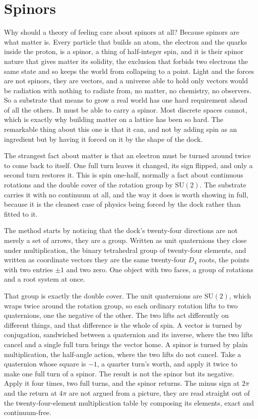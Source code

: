 \section{Spinors}

Why should a theory of feeling care about spinors at all? Because spinors are what matter is. Every particle that builds an atom, the electron and the quarks inside the proton, is a spinor, a thing of half-integer spin, and it is their spinor nature that gives matter its solidity, the exclusion that forbids two electrons the same state and so keeps the world from collapsing to a point. Light and the forces are not spinors, they are vectors, and a universe able to hold only vectors would be radiation with nothing to radiate from, no matter, no chemistry, no observers. So a substrate that means to grow a real world has one hard requirement ahead of all the others. It must be able to carry a spinor. Most discrete spaces cannot, which is exactly why building matter on a lattice has been so hard. The remarkable thing about this one is that it can, and not by adding spin as an ingredient but by having it forced on it by the shape of the dock.

The strangest fact about matter is that an electron must be turned around twice to come back to itself. One full turn leaves it changed, its sign flipped, and only a second turn restores it. This is spin one-half, normally a fact about continuous rotations and the double cover of the rotation group by $\mathrm{SU}(2)$. The substrate carries it with no continuum at all, and the way it does is worth showing in full, because it is the cleanest case of physics being forced by the dock rather than fitted to it.

The method starts by noticing that the dock's twenty-four directions are not merely a set of arrows, they are a group. Written as unit quaternions they close under multiplication, the binary tetrahedral group of twenty-four elements, and written as coordinate vectors they are the same twenty-four $D_4$ roots, the points with two entries $\pm 1$ and two zero. One object with two faces, a group of rotations and a root system at once.

That group is exactly the double cover. The unit quaternions are $\mathrm{SU}(2)$, which wraps twice around the rotation group, so each ordinary rotation lifts to two quaternions, one the negative of the other. The two lifts act differently on different things, and that difference is the whole of spin. A vector is turned by conjugation, sandwiched between a quaternion and its inverse, where the two lifts cancel and a single full turn brings the vector home. A spinor is turned by plain multiplication, the half-angle action, where the two lifts do not cancel. Take a quaternion whose square is $-1$, a quarter turn's worth, and apply it twice to make one full turn of a spinor. The result is not the spinor but its negative. Apply it four times, two full turns, and the spinor returns. The minus sign at $2\pi$ and the return at $4\pi$ are not argued from a picture, they are read straight out of the twenty-four-element multiplication table by composing its elements, exact and continuum-free.

